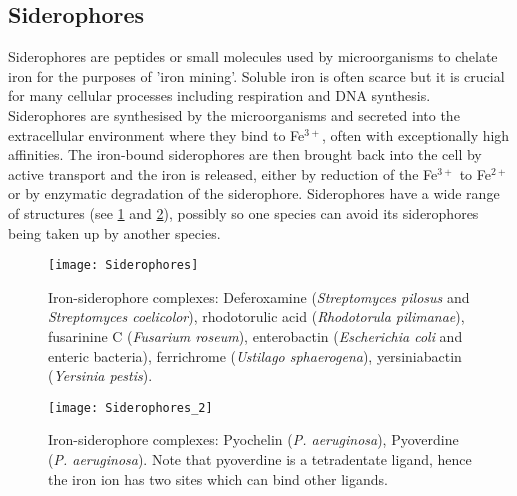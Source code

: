 \subsection{Siderophores}

Siderophores are peptides or small molecules used by microorganisms to chelate iron for the purposes of 'iron mining'\cite{Hider2010}. Soluble iron is often scarce but it is crucial for many cellular processes including respiration and DNA synthesis. Siderophores are synthesised by the microorganisms and secreted into the extracellular environment where they bind to Fe$^{3+}$, often with exceptionally high affinities. The iron-bound siderophores are then brought back into the cell by active transport and the iron is released, either by reduction of the Fe$^{3+}$ to Fe$^{2+}$ or by enzymatic degradation of the siderophore. Siderophores have a wide range of structures (see \ref{fgr:Sids} and \ref{fgr:Sids_2}), possibly so one species can avoid its siderophores being taken up by another species\cite{Seyedsayamdost2012}.

\begin{figure}[H]
	\begin{center}
		\texttt{[image: Siderophores]}
		\caption{Iron-siderophore complexes:
		Deferoxamine \cite{Zheng2012} (\textit{Streptomyces pilosus} and \textit{Streptomyces coelicolor}), 
		rhodotorulic acid \cite{Carrano1978} (\textit{Rhodotorula pilimanae}),
		fusarinine C \cite{Hossain1980} (\textit{Fusarium roseum}),
		enterobactin \cite{Zheng2012} (\textit{Escherichia coli} and enteric bacteria),
		ferrichrome \cite{vanderHelm1980} (\textit{Ustilago sphaerogena}),
		yersiniabactin \cite{Zheng2012} (\textit{Yersinia pestis}).
		\label{fgr:Sids}}
	\end{center}
\end{figure}

\begin{figure}[H]
	\begin{center}
		\texttt{[image: Siderophores\_2]}
		\caption{Iron-siderophore complexes:
		Pyochelin \cite{Schlegel2006} (\textit{P. aeruginosa}),
		Pyoverdine \cite{Zheng2012} (\textit{P. aeruginosa}). Note that pyoverdine  is a tetradentate ligand, hence the iron ion has two sites which can bind other ligands. \label{fgr:Sids_2}}
	\end{center}
\end{figure}

